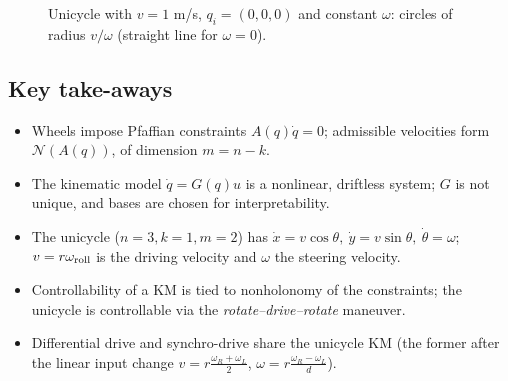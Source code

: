 \documentclass[11pt,a4paper]{article}
\newcommand{\N}{\mathcal{N}}
\newcommand{\dq}{\dot q}
\theoremstyle{definition}
\theoremstyle{plain}
\theoremstyle{remark}
\begin{document}
\begin{figure}[h]
\centering
{}
\caption{Unicycle with $v=1$ m/s, $q_i=(0,0,0)$ and constant $\omega$: circles of radius $v/\omega$ (straight line for $\omega=0$).}
\end{figure}

\subsection*{Key take-aways}
\begin{itemize}
\item Wheels impose Pfaffian constraints $A(q)\dq=0$; admissible velocities form $\N(A(q))$, of dimension $m=n-k$.
\item The kinematic model $\dq=G(q)u$ is a nonlinear, driftless system; $G$ is not unique, and bases are chosen for interpretability.
\item The unicycle ($n=3,k=1,m=2$) has $\dot x=v\cos\theta,\ \dot y=v\sin\theta,\ \dot\theta=\omega$; $v=r\omega_{\rm roll}$ is the driving velocity and $\omega$ the steering velocity.
\item Controllability of a KM is tied to nonholonomy of the constraints; the unicycle is controllable via the \emph{rotate--drive--rotate} maneuver.
\item Differential drive and synchro-drive share the unicycle KM (the former after the linear input change $v=r\frac{\omega_R+\omega_L}2$, $\omega=r\frac{\omega_R-\omega_L}d$).
\end{itemize}

\newpage

\setcounter{section}{0}
\renewcommand{\thesection}{\arabic{section}}
\end{document}
